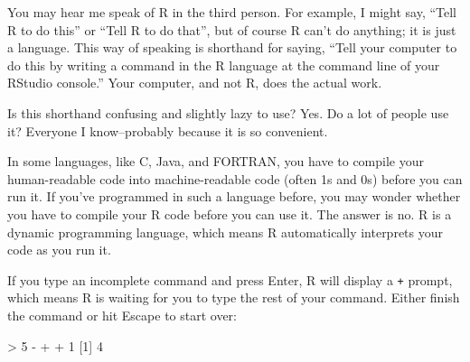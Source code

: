 \documentclass[
  letterpaper,
  DIV=11,
  numbers=noendperiod]{scrbook}
\newenvironment{Shaded}{\begin{snugshade}}{\end{snugshade}}
\newcommand{\DecValTok}[1]{\textcolor[rgb]{0.68,0.00,0.00}{#1}}
\newcommand{\NormalTok}[1]{\textcolor[rgb]{0.00,0.23,0.31}{#1}}
\newcommand{\SpecialCharTok}[1]{\textcolor[rgb]{0.37,0.37,0.37}{#1}}
\begin{document}
\begin{tcolorbox}[enhanced jigsaw, breakable, colback=white, colbacktitle=quarto-callout-note-color!10!white, arc=.35mm, bottomrule=.15mm, coltitle=black, left=2mm, rightrule=.15mm, colframe=quarto-callout-note-color-frame, leftrule=.75mm, opacitybacktitle=0.6, bottomtitle=1mm, toptitle=1mm, titlerule=0mm, opacityback=0, title=\textcolor{quarto-callout-note-color}{\faInfo}\hspace{0.5em}{Note}, toprule=.15mm]

You may hear me speak of R in the third person. For example, I might
say, ``Tell R to do this'' or ``Tell R to do that'', but of course R
can't do anything; it is just a language. This way of speaking is
shorthand for saying, ``Tell your computer to do this by writing a
command in the R language at the command line of your RStudio console.''
Your computer, and not R, does the actual work.

Is this shorthand confusing and slightly lazy to use? Yes. Do a lot of
people use it? Everyone I know--probably because it is so convenient.

\end{tcolorbox}

\begin{tcolorbox}[enhanced jigsaw, breakable, colback=white, colbacktitle=quarto-callout-note-color!10!white, arc=.35mm, bottomrule=.15mm, coltitle=black, left=2mm, rightrule=.15mm, colframe=quarto-callout-note-color-frame, leftrule=.75mm, opacitybacktitle=0.6, bottomtitle=1mm, toptitle=1mm, titlerule=0mm, opacityback=0, title=\textcolor{quarto-callout-note-color}{\faInfo}\hspace{0.5em}{Note}, toprule=.15mm]

In some languages, like C, Java, and FORTRAN, you have to compile your
human-readable code into machine-readable code (often 1s and 0s) before
you can run it. If you've programmed in such a language before, you may
wonder whether you have to compile your R code before you can use it.
The answer is no. R is a dynamic programming language, which means R
automatically interprets your code as you run it.

\end{tcolorbox}

If you type an incomplete command and press Enter, R will display a
\texttt{+} prompt, which means R is waiting for you to type the rest of
your command. Either finish the command or hit Escape to start over:

\begin{Shaded}
\begin{Highlighting}[]
\SpecialCharTok{\textgreater{}} \DecValTok{5} \SpecialCharTok{{-}}
\SpecialCharTok{+}
\SpecialCharTok{+} \DecValTok{1}
\NormalTok{[}\DecValTok{1}\NormalTok{] }\DecValTok{4}
\end{Highlighting}
\end{Shaded}
\end{document}
